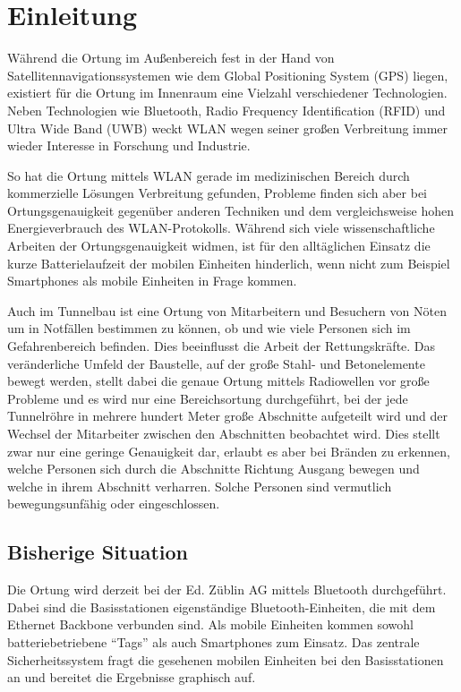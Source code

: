 \chapter{Einleitung}
\label{ch:Einleitung}
Während die Ortung im Außenbereich fest in der Hand von Satellitennavigationssystemen wie dem Global Positioning System (GPS) liegen, existiert für die Ortung im Innenraum eine Vielzahl verschiedener Technologien. Neben Technologien wie Bluetooth, Radio Frequency Identification (RFID) und Ultra Wide Band (UWB) weckt WLAN wegen seiner großen Verbreitung immer wieder Interesse in Forschung und Industrie. 

So hat die Ortung mittels WLAN gerade im medizinischen Bereich durch kommerzielle Lösungen Verbreitung gefunden, Probleme finden sich aber bei Ortungsgenauigkeit gegenüber anderen Techniken und dem vergleichsweise hohen Energieverbrauch des WLAN-Protokolls.
Während sich viele wissenschaftliche Arbeiten der Ortungsgenauigkeit widmen, ist für den alltäglichen Einsatz die kurze Batterielaufzeit der mobilen Einheiten hinderlich, wenn nicht zum Beispiel Smartphones als mobile Einheiten in Frage kommen. 

Auch im Tunnelbau ist eine Ortung von Mitarbeitern und Besuchern von Nöten um in Notfällen bestimmen zu können, ob und wie viele Personen sich im Gefahrenbereich befinden. 
Dies beeinflusst die Arbeit der Rettungskräfte. 
Das veränderliche Umfeld der Baustelle, auf der große Stahl- und Betonelemente bewegt werden, stellt dabei die genaue Ortung mittels Radiowellen vor große Probleme und es wird nur eine Bereichsortung durchgeführt, bei der jede Tunnelröhre in mehrere hundert Meter große Abschnitte aufgeteilt wird und der Wechsel der Mitarbeiter zwischen den Abschnitten beobachtet wird. 
Dies stellt zwar nur eine geringe Genauigkeit dar, erlaubt es aber bei Bränden zu erkennen, welche Personen sich durch die Abschnitte Richtung Ausgang bewegen und welche in ihrem Abschnitt verharren. 
Solche Personen sind vermutlich bewegungsunfähig oder eingeschlossen.


\section{Bisherige Situation}
Die Ortung wird derzeit bei der Ed. Züblin AG mittels Bluetooth durchgeführt. 
Dabei sind die Basisstationen eigenständige Bluetooth-Einheiten, die mit dem Ethernet Backbone verbunden sind.
Als mobile Einheiten kommen sowohl batteriebetriebene "`Tags"' als auch Smartphones zum Einsatz. 
Das zentrale Sicherheitssystem fragt die gesehenen mobilen Einheiten bei den Basisstationen an und bereitet die Ergebnisse graphisch auf.

